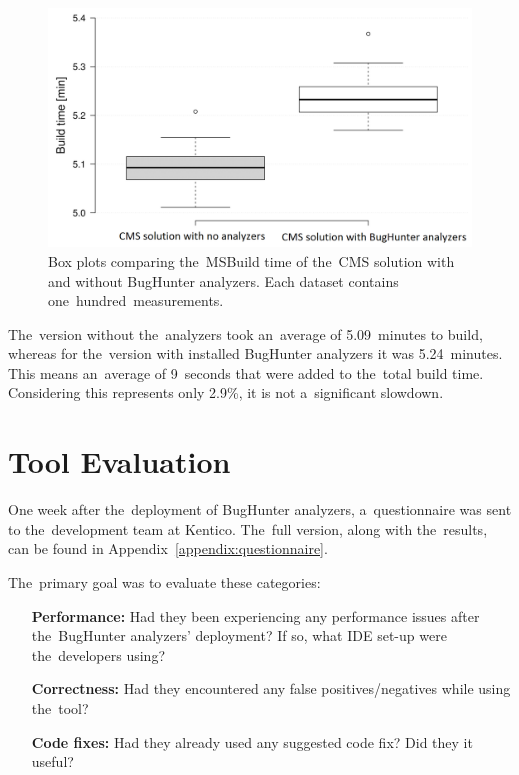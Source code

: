 \documentclass[
  digital, %
  table,   %
  lof,     %
  lot,     %
  oneside,
]{fithesis3}
\begin{document}
\begin{figure}[h!]
		\centering   
			\includegraphics[scale=0.26]{img/build-time-boxplots}
		\caption{Box plots comparing the~MSBuild time of the~CMS solution with and without BugHunter analyzers. Each dataset contains one~hundred~measurements.}
		\label{fig:build-times-boxplots}
\end{figure}

The~version without the~analyzers took an~average of 5.09~minutes to build, whereas for the~version with installed BugHunter analyzers it was 5.24~minutes. This means an~average of 9~seconds that were added to the~total build time. Considering this represents only 2.9\%, it is  not a~significant slowdown.

\newpage
\section{Tool Evaluation}
One week after the~deployment of BugHunter analyzers, a~questionnaire was sent to the~development team at Kentico. The~full version, along with the~results, can be found in Appendix~\ref{appendix:questionnaire}. 

The~primary goal was to evaluate these categories:

\begin{itemize}
\item[\textbf{Performance:}] Had they been experiencing any performance issues after the~BugHunter analyzers' deployment? If so, what IDE set-up were the~developers using?

\item[\textbf{Correctness:}] Had they encountered any false positives/negatives while using the~tool?

\item[\textbf{Code fixes:}] Had they already used any suggested code fix? Did they it useful?
\end{itemize}
\end{document}
